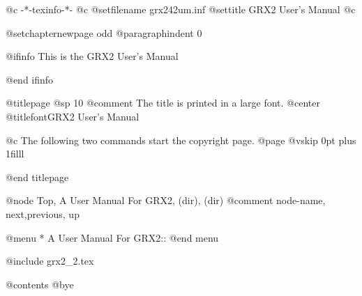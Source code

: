    @c -*-texinfo-*-
@c %
@setfilename grx242um.inf
@settitle GRX2 User's Manual
@c %

@setchapternewpage odd
@paragraphindent 0

@ifinfo
This is the GRX2 User's Manual

@end ifinfo

@titlepage
@sp 10
@comment The title is printed in a large font.
@center @titlefont{GRX2 User's Manual}

@c The following two commands start the copyright page.
@page
@vskip 0pt plus 1filll

@end titlepage


@node  Top, A User Manual For GRX2, (dir), (dir)
@comment node-name, next,previous, up

@menu
* A User Manual For GRX2::
@end menu

@include grx2_2.tex

@contents
@bye

